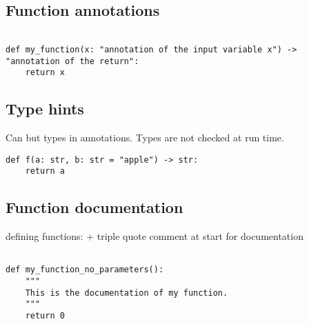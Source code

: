 \subsection{Function annotations}

\begin{verbatim}

def my_function(x: "annotation of the input variable x") -> "annotation of the return":
    return x

\end{verbatim}

\subsection{Type hints}

Can but types in annotations. Types are not checked at run time.

\begin{verbatim}
def f(a: str, b: str = "apple") -> str:
    return a
\end{verbatim}

\subsection{Function documentation}
defining functions:
+ triple quote comment at start for documentation

\begin{verbatim}

def my_function_no_parameters():
    """
    This is the documentation of my function.
    """
    return 0

\end{verbatim}

